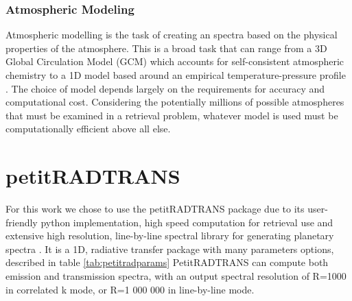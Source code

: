 \cite{Batalha2018}%
\cite{Feng2018} %
\cite{Molliere2019}%
\subsubsection{Atmospheric Modeling}
Atmospheric modelling is the task of creating an spectra based on the physical properties of the atmosphere.
This is a broad task that can range from a 3D Global Circulation Model (GCM) which accounts for self-consistent atmospheric chemistry \parencite{Chen2019} to a 1D model based around an empirical temperature-pressure profile \parencite{Molliere2019}.
The choice of model depends largely on the requirements for accuracy and computational cost. 
Considering the potentially millions of possible atmospheres that must be examined in a retrieval problem, whatever model is used must be computationally efficient above all else.

\section{petitRADTRANS}
For this work we chose to use the petitRADTRANS package due to its user-friendly python implementation, high speed computation for retrieval use and extensive high resolution, line-by-line spectral library for generating planetary spectra \parencite{Molliere2019}. 
It is a 1D, radiative transfer package with many parameters options, described in table \ref{tab:petitradparams}
PetitRADTRANS can compute both emission and transmission spectra, with an output spectral resolution of R=1000 in correlated k mode, or R=1 000 000 in line-by-line mode. 

